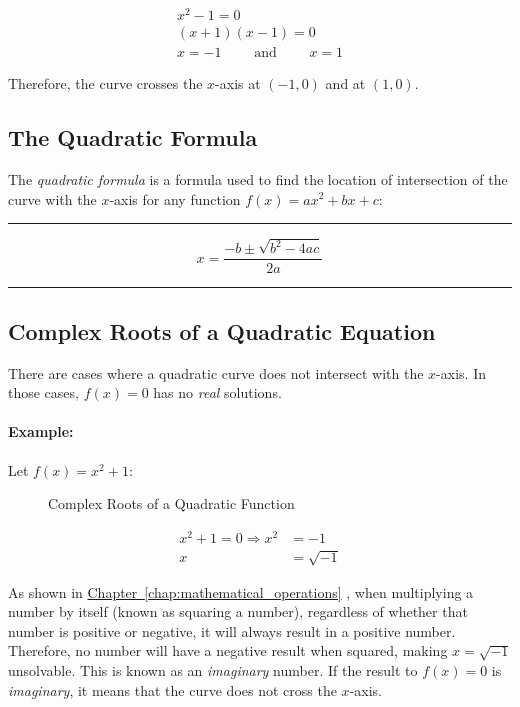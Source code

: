\documentclass[a5paper,9pt]{book}
\theoremstyle{definition}
\newcommand{\txtlinesur}[1]{%
    \vspace*{\baselineskip}

    \hrule%

    \vspace*{\medskipamount}

    #1

    \vspace*{\medskipamount}

    \hrule%

    \vspace*{\baselineskip}
}
\newcommand{\Rarr}{\Rightarrow}
\newcommand{\fig}[2]{%
    \hyperref[#2]{#1~\ref*{#2}}%
}
\begin{document}
        \begin{gather*}
            x^2-1 = 0 \\
            (x+1)(x-1) = 0 \\[5pt]
            x = -1 \qquad\text{ and }\qquad x = 1
        \end{gather*}

        Therefore, the curve crosses the $x$-axis at $(-1,0)$ and at $(1,0)$.

        \subsection{The Quadratic Formula}

        The \emph{quadratic formula} is a formula used to find the location of intersection
        of the curve with the $x$-axis for any function $f(x)=ax^2+bx+c$:

        \txtlinesur{%
            \begin{equation}
                x = \frac{-b\pm\sqrt{b^2-4ac}}{2a}
            \end{equation}
        }

        \subsection{Complex Roots of a Quadratic Equation}

        There are cases where a quadratic curve does not intersect with the $x$-axis.
        In those cases, $f(x)=0$ has no \emph{real} solutions.

        \paragraph{Example:} Let \(f(x)=x^2+1\):

        \begin{figure}[ht]
            \centering
            
            \caption{Complex Roots of a Quadratic Function}%
            \label{fig:complex_roots_of_quadratic_function}
        \end{figure}

        \begin{align*}
            x^2+1 = 0 \Rarr x^2 &= -1 \\
            x &= \sqrt{-1}
        \end{align*}

        As shown in \fig{Chapter}{chap:mathematical_operations}, when multiplying a number
        by itself (known as squaring a number), regardless of whether that number is positive or negative,
        it will always result in a positive number. Therefore, no number will have a
        negative result when squared, making $x=\sqrt{-1}$ unsolvable. This is known
        as an \emph{imaginary} number. If the result to $f(x)=0$ is \emph{imaginary}, it means
        that the curve does not cross the $x$-axis.
\end{document}

